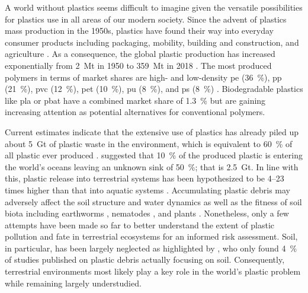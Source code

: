 A world without plastics seems difficult to imagine given the versatile possibilities for plastics use in all areas of our modern society. Since the advent of plastics mass production in the 1950s, plastics have found their way into everyday consumer products including packaging, mobility, building and construction, and agriculture \citep{GeyerProduction2017,KaweckiPolymerSpecific2019}. As a consequence, the global plastic production has increased exponentially from \SI{2}{\mega\tonne} in 1950 to \SI{359}{\mega\tonne} in 2018 \citep{PlasticsEuropePlastics2019,GeyerProduction2017}. The most produced polymers in terms of market shares are high- and low-density \ac{pe} (\SI{36}{\percent}), \ac{pp} (\SI{21}{\percent}), \ac{pvc} (\SI{12}{\percent}), \ac{pet} (\SI{10}{\percent}), \ac{pu} (\SI{8}{\percent}), and \ac{ps} (\SI{8}{\percent}) \citep{GeyerProduction2017}. Biodegradable plastics like \ac{pla} or \ac{pbat} have a combined market share of \SI{1.3}{\percent} \citep{BurgstallerStudy2018} but are gaining increasing attention as potential alternatives for conventional polymers.

Current estimates indicate that the extensive use of plastics has already piled up about \SI{5}{\giga\tonne} of plastic waste in the environment, which is equivalent to \SI{60}{\percent} of all plastic ever produced \citep{GeyerProduction2017}.  suggested that \SI{10}{\percent} of the produced plastic is entering the world's oceans leaving an unknown sink of \SI{50}{\percent}; that is \SI{2.5}{\giga\tonne}.
In line with this, plastic release into terrestrial systems has been hypothesized to be \numrange{4}{23} times higher than that into aquatic systems \citep{HortonLarge2017}. Accumulating plastic debris may adversely affect the soil structure and water dynamics \citep{deSouzaMachadoMicroplastics2019,deSouzaMachadoMicroplastics2020} as well as the fitness of soil biota including earthworms \citep{BootsEffects2019}, nematodes \citep{LeiPolystyrene2018}, and plants \citep{RilligMicroplastic2019,BuksWhat2020}. Nonetheless, only a few attempts have been made so far to better understand the extent of plastic pollution and fate in terrestrial ecosystems for an informed risk assessment. Soil, in particular, has been largely neglected as highlighted by \citet{HeMicroplastics2018}, who only found \SI{4}{\percent} of studies published on plastic debris actually focusing on soil. Consequently, terrestrial environments most likely play a key role in the world's plastic problem while remaining largely understudied.

